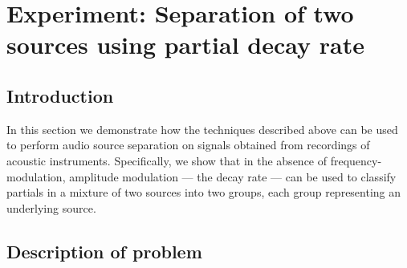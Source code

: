 \chapter{Experiment: Separation of two sources using partial decay rate
\label{chap:decaysep}}



\section{Introduction}

In this section we demonstrate how the techniques described above can be used to
perform audio source separation on signals obtained from recordings of acoustic
instruments. Specifically, we show that in the absence of frequency-modulation,
amplitude modulation --- the decay rate --- can be used to classify partials
in a mixture of two sources into two groups, each group representing an
underlying source.

\section{Description of problem}

